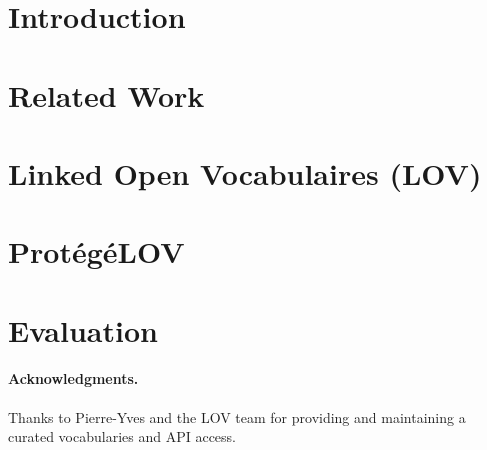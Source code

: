 \documentclass[runningheads,a4paper]{llncs}
\begin{document}
\vspace{-3mm}
\section{Introduction}\label{sec:introduction}




\vspace{-3mm}
\section{Related Work}\label{sec:soa}
\vspace{-3mm}



\vspace{-3mm}
\section{Linked Open Vocabulaires (LOV)}\label{sec:lov}
\vspace{-3mm}




\vspace{-3mm}
\section{Prot{\'e}g{\'e}LOV}\label{sec:classification}



\vspace{-3mm}
\section{Evaluation}\label{sec:conclusion}




\vspace{-3mm}
\paragraph{\textbf{Acknowledgments.}} %
Thanks to Pierre-Yves and the LOV team for providing and maintaining a curated vocabularies and API access.
\vspace{-3mm}

\nocite{*}

\end{document}
